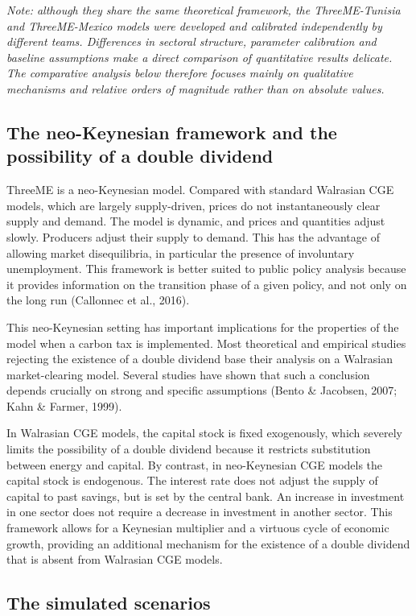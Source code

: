 \documentclass[12pt, a4paper]{article}
\begin{document}
\textit{Note: although they share the same theoretical framework, the ThreeME-Tunisia and ThreeME-Mexico models were developed and calibrated independently by different teams. Differences in sectoral structure, parameter calibration and baseline assumptions make a direct comparison of quantitative results delicate. The comparative analysis below therefore focuses mainly on qualitative mechanisms and relative orders of magnitude rather than on absolute values.}

\subsection{The neo-Keynesian framework and the possibility of a double dividend}
\label{subsec:neokeynesian}

ThreeME is a neo-Keynesian model. Compared with standard Walrasian CGE models, which are largely supply-driven, prices do not instantaneously clear supply and demand. The model is dynamic, and prices and quantities adjust slowly. Producers adjust their supply to demand. This has the advantage of allowing market disequilibria, in particular the presence of involuntary unemployment. This framework is better suited to public policy analysis because it provides information on the transition phase of a given policy, and not only on the long run (Callonnec et al., 2016).

This neo-Keynesian setting has important implications for the properties of the model when a carbon tax is implemented. Most theoretical and empirical studies rejecting the existence of a double dividend base their analysis on a Walrasian market-clearing model. Several studies have shown that such a conclusion depends crucially on strong and specific assumptions (Bento \& Jacobsen, 2007; Kahn \& Farmer, 1999).

In Walrasian CGE models, the capital stock is fixed exogenously, which severely limits the possibility of a double dividend because it restricts substitution between energy and capital. By contrast, in neo-Keynesian CGE models the capital stock is endogenous. The interest rate does not adjust the supply of capital to past savings, but is set by the central bank. An increase in investment in one sector does not require a decrease in investment in another sector. This framework allows for a Keynesian multiplier and a virtuous cycle of economic growth, providing an additional mechanism for the existence of a double dividend that is absent from Walrasian CGE models.

\subsection{The simulated scenarios}
\label{subsec:scenarios}
\end{document}
